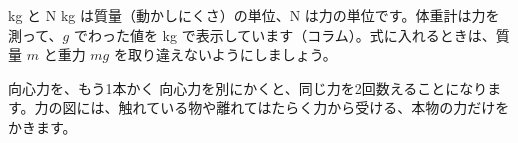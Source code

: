 \begin{tsumazuki}{kg と N}
kg は質量（動かしにくさ）の単位、N は力の単位です。体重計は力を測って、$g$ でわった値を kg で表示しています（コラム）。式に入れるときは、質量 $m$ と重力 $mg$ を取り違えないようにしましょう。
\end{tsumazuki}

\begin{tsumazuki}{向心力を、もう1本かく}
向心力を別にかくと、同じ力を2回数えることになります。力の図には、触れている物や離れてはたらく力から受ける、本物の力だけをかきます。
\end{tsumazuki}


